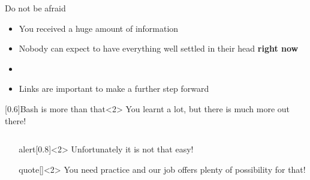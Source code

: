 
\begin{frame}{Do not be afraid}
    \vspace{-4mm}
    \begin{itemize}
        \item \alert{You received a huge amount of information}
        \item Nobody can expect to have everything well settled in their head \textbf{right now}
        \item {}
        \item Links are important to make a further step forward
    \end{itemize}
    \vspace{-2mm}
    \begin{varblock}{}[0.6\textwidth]{Bash is more than that}<2>
        You learnt a lot, but there is much more out there!
    \end{varblock}
    \vspace{5mm}
    \begin{columns}[c]
        \begin{column}{0.3\textwidth}
        \end{column}
        \begin{column}{0.5\textwidth}
            \begin{varblock}{alert}[0.8\textwidth]{}<2>
                \alert{Unfortunately it is not that easy!}
            \end{varblock}
            \begin{varblock}{quote}[\textwidth]{}<2>
                \normalfont
                You need practice and our job offers plenty of possibility for that!
            \end{varblock}
        \end{column}
    \end{columns}
\end{frame}
